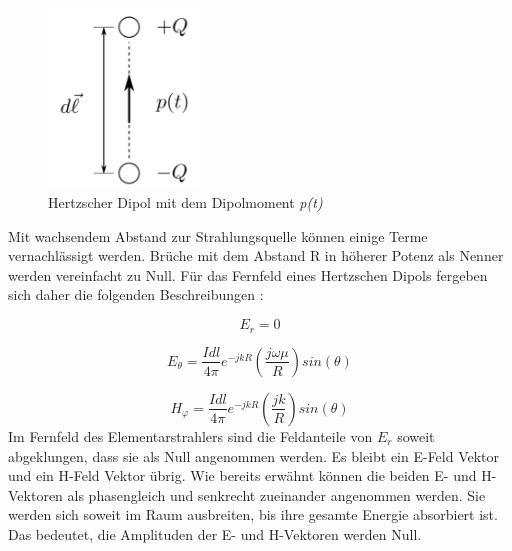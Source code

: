 \begin{figure}[!ht]
	\centering
	\includegraphics[width=4cm]{content/bilder/HerzDipolEMANTS37.pdf}%
	\caption{Hertzscher Dipol mit dem Dipolmoment \textit{p(t)} \cite{Emant}}
	\label{HerzDipol}
\end{figure}


Mit wachsendem Abstand zur Strahlungsquelle können einige Terme vernachlässigt werden. Brüche mit dem  Abstand R in höherer Potenz als Nenner werden vereinfacht zu Null. Für das Fernfeld eines Hertzschen Dipols fergeben sich daher die folgenden Beschreibungen \cite{elliott1981antenna}:


\begin{equation}
E_r= 0
\end{equation}

\begin{equation}
E_\theta= \frac{I dl}{4\pi}   e^{-jkR} \left( \frac{j\omega \mu}{R}  \right) sin(\theta)
\end{equation}

\begin{equation}
H_\varphi= \frac{I dl}{4\pi}   e^{-jkR} \left( \frac{jk}{R} \right) sin(\theta)
\end{equation}
Im Fernfeld des Elementarstrahlers sind die Feldanteile von $E_r$ soweit abgeklungen, dass sie als Null angenommen werden. Es bleibt ein E-Feld Vektor und ein H-Feld Vektor übrig. Wie bereits erwähnt können die beiden E- und H-Vektoren als phasengleich und senkrecht zueinander angenommen werden. Sie werden sich soweit im Raum ausbreiten, bis ihre gesamte Energie absorbiert ist. Das bedeutet, die Amplituden der E- und H-Vektoren werden Null.\\


